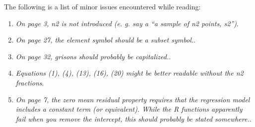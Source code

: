 \documentclass{article}
\begin{document}
The following is a list of minor issues encountered while reading:\\

\begin{enumerate}
	
	\item \textit{On page 3, n2 is not introduced (e. g. say a “a sample of n2 points, s2”)}.
	
	
	\item \textit{On page 27, the element symbol should be a subset symbol.}.
	
	
	\item \textit{On page 32, grisons should probably be capitalized.}.
	
	
	\item \textit{Equations (1), (4), (13), (16), (20) might be better readable without the n2 fractions}.
	
	
	\item \textit{On page 7, the zero mean residual property requires that the regression model includes a constant term (or equivalent). While the R functions apparently fail when you remove the intercept, this should probably be stated somewhere.}.
	
	
\end{enumerate} 


\end{document}
